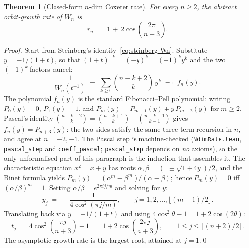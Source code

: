 \documentclass[11pt,a4paper]{article}
\newtheorem{theorem}{Theorem}
\theoremstyle{remark}
\theoremstyle{plain}
\begin{document}
\begin{theorem}[Closed-form $n$-dim Coxeter rate]
\label{thm:ndim-rate}
For every $n \ge 2$, the abstract orbit-growth rate of $W_n$ is
\[
r_n  \;=\;  1 \,+\, 2 \cos\!\left(\frac{2\pi}{n+3}\right).
\]
\end{theorem}

\begin{proof}
Start from Steinberg's identity~\eqref{eq:steinberg-Wn}.  Substitute
$y = -1/(1+t)$, so that $(1+t)^{-k} = (-y)^k = (-1)^k y^k$ and the
two $(-1)^k$ factors cancel:
\[
\frac{1}{W_n(t^{-1})}  \;=\;  \sum_{k \ge 0} \binom{n-k+2}{k}\, y^k
                      \;=:\;  f_n(y).
\]
The polynomial $f_n(y)$ is the standard Fibonacci--Pell polynomial:
writing $P_0(y) = 0$, $P_1(y) = 1$, and
$P_m(y) = P_{m-1}(y) + y\, P_{m-2}(y)$ for $m \ge 2$, Pascal's
identity $\binom{n-k+2}{k} = \binom{n-k+1}{k} + \binom{n-k+1}{k-1}$
gives $f_n(y) = P_{n+3}(y)$: the two sides satisfy the same three-term recursion in $n$, and agree
at $n=-2,-1$. The Pascal step is machine-checked (\texttt{NdimRate.lean}, \texttt{pascal\_step} and
\texttt{coeff\_pascal}; \texttt{pascal\_step} depends on \emph{no} axioms), so the only unformalised
part of this paragraph is the induction that assembles it.  The characteristic equation
$x^2 = x + y$ has roots $\alpha, \beta = (1 \pm \sqrt{1+4y})/2$, and
the Binet formula yields $P_m(y) = (\alpha^m - \beta^m)/(\alpha - \beta)$;
hence $P_m(y) = 0$ iff $(\alpha/\beta)^m = 1$.  Setting
$\alpha/\beta = e^{2\pi i j / m}$ and solving for $y$:
\[
y_j  \;=\;  -\frac{1}{4 \cos^2(\pi j / m)},
\qquad j = 1, 2, \ldots, \lfloor (m-1)/2 \rfloor.
\]
Translating back via $y = -1/(1+t)$ and using
$4 \cos^2\theta - 1 = 1 + 2 \cos(2\theta)$:
\[
t_j  \;=\;  4 \cos^2\!\left(\frac{\pi j}{n+3}\right) - 1
       \;=\;  1 + 2 \cos\!\left(\frac{2\pi j}{n+3}\right),
\qquad 1 \le j \le \lfloor (n+2)/2 \rfloor.
\]
The asymptotic growth rate is the largest root, attained at $j = 1$.\qed
\end{proof}
\end{document}
